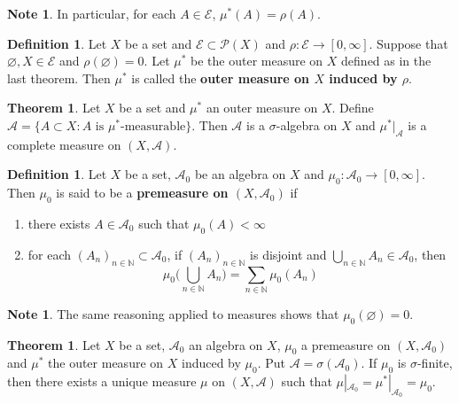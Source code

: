 \documentclass[12pt]{amsart}
\theoremstyle{definition}
\newtheorem{defn}[definition]{Definition}
\newtheorem{note}[definition]{Note}
\newtheorem{thm}[definition]{Theorem}
\newcommand{\sig}{\sigma}
\newcommand{\N}{\mathbb{N}}
\newcommand{\MA}{\mathcal{A}}
\newcommand{\MP}{\mathcal{P}}
\newcommand{\ME}{\mathcal{E}}
\newcommand{\ld}[1]{\label{defn:#1}}
\begin{document}
	\begin{note}
		In particular, for each $A \in \ME$, $\mu^*(A) = \rho(A)$.
	\end{note}
	
	\begin{defn} \ld{00000} 
		Let $X$ be a set and $\ME \subset \MP(X)$ and $\rho: \ME \rightarrow [0, \infty]$. Suppose that $\varnothing, X \in \ME$ and $\rho(\varnothing) = 0$. Let $\mu^*$ be the outer measure on $X$ defined as in the last theorem. Then $\mu^*$ is called the \textbf{outer measure on $X$ induced by $\rho$}.
	\end{defn}
	
	\begin{thm}
		Let $X$ be a set and $\mu^*$ an outer measure on $X$. Define $\MA = \{A \subset X: A \text{ is }\mu^*\text{-measurable}\}$. Then $\MA$ is a $\sig$-algebra on $X$ and $\mu^*|_{\MA}$ is a complete measure on $(X, \MA)$.
	\end{thm}
	
	\begin{defn} \ld{00000} 
		Let $X$ be a set, $\MA_0$ be an algebra on $X$ and $\mu_0:\MA_0 \rightarrow [0, \infty]$. Then $\mu_0$ is said to be a \textbf{premeasure on $(X,\MA_0)$} if 
		\begin{enumerate}
			\item there exists $A \in \MA_0$ such that $\mu_0(A)< \infty$
			\item for each $(A_n)_{n \in \N} \subset \MA_0$, if $(A_n)_{n \in \N}$ is disjoint and $\bigcup\limits_{n \in \N}A_n \in \MA_0$, then $$\mu_0 \bigg(\bigcup_{n\in \N}A_n \bigg) = \sum_{n \in \N}\mu_0(A_n)$$
		\end{enumerate}
	\end{defn}
	
	\begin{note}
		The same reasoning applied to measures shows that $\mu_0(\varnothing) = 0$.
	\end{note}
	
	\begin{thm}
		Let $X$ be a set, $\MA_0$ an algebra on $X$, $\mu_0$ a premeasure on $(X,\MA_0)$ and $\mu^*$ the outer measure on $X$ induced by $\mu_0$. Put $\MA = \sig(\MA_0)$. If $\mu_0$ is $\sig$-finite, then there exists a unique measure $\mu$ on $(X, \MA)$ such that $\mu|_{\MA_0} = \mu^*|_{\MA_0} = \mu_0$. 
	\end{thm}
	
	
	
	
	
	
	
\end{document}
